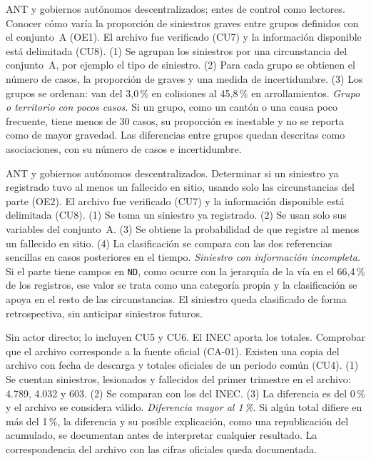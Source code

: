 {ANT y gobiernos autónomos descentralizados; entes de control como lectores.}
{Conocer cómo varía la proporción de siniestros graves entre grupos definidos con el conjunto~A (OE1).}
{El archivo fue verificado (CU7) y la información disponible está delimitada (CU8).}
{(1) Se agrupan los siniestros por una circunstancia del conjunto~A, por ejemplo el tipo de siniestro. (2) Para cada grupo se obtienen el número de casos, la proporción de graves y una medida de incertidumbre. (3) Los grupos se ordenan: van del 3,0\,\% en colisiones al 45,8\,\% en arrollamientos.}
{\emph{Grupo o territorio con pocos casos.} Si un grupo, como un cantón o una causa poco frecuente, tiene menos de 30 casos, su proporción es inestable y no se reporta como de mayor gravedad.}
{Las diferencias entre grupos quedan descritas como asociaciones, con su número de casos e incertidumbre.}

{ANT y gobiernos autónomos descentralizados.}
{Determinar si un siniestro ya registrado tuvo al menos un fallecido en sitio, usando solo las circunstancias del parte (OE2).}
{El archivo fue verificado (CU7) y la información disponible está delimitada (CU8).}
{(1) Se toma un siniestro ya registrado. (2) Se usan solo sus variables del conjunto~A. (3) Se obtiene la probabilidad de que registre al menos un fallecido en sitio. (4) La clasificación se compara con las dos referencias sencillas en casos posteriores en el tiempo.}
{\emph{Siniestro con información incompleta.} Si el parte tiene campos en \texttt{ND}, como ocurre con la jerarquía de la vía en el 66,4\,\% de los registros, ese valor se trata como una categoría propia y la clasificación se apoya en el resto de las circunstancias.}
{El siniestro queda clasificado de forma retrospectiva, sin anticipar siniestros futuros.}

{Sin actor directo; lo incluyen CU5 y CU6. El INEC aporta los totales.}
{Comprobar que el archivo corresponde a la fuente oficial (CA-01).}
{Existen una copia del archivo con fecha de descarga y totales oficiales de un periodo común (CU4).}
{(1) Se cuentan siniestros, lesionados y fallecidos del primer trimestre en el archivo: 4.789, 4.032 y 603. (2) Se comparan con los del INEC. (3) La diferencia es del 0\,\% y el archivo se considera válido.}
{\emph{Diferencia mayor al 1\,\%.} Si algún total difiere en más del 1\,\%, la diferencia y su posible explicación, como una republicación del acumulado, se documentan antes de interpretar cualquier resultado.}
{La correspondencia del archivo con las cifras oficiales queda documentada.}


